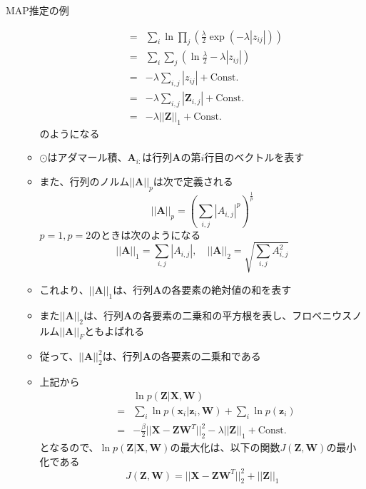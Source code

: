 \documentclass[dvipdfmx,notheorems,t]{beamer}
\begin{document}
\begin{frame}{MAP推定の例}
\begin{itemize}
\begin{itemize}
\begin{eqnarray}
			&=& \sum_i \ln \prod_j \left( \frac{\lambda}{2} \exp \left( -\lambda |z_{ij}| \right) \right) \nonumber \\
			&=& \sum_i \sum_j \left( \ln \frac{\lambda}{2} - \lambda |z_{ij}| \right) \nonumber \\
			&=& -\lambda \sum_{i, j} |z_{ij}| + \mathrm{Const.} \\
			&=& -\lambda \sum_{i, j} |\bm{Z}_{i, j}| + \mathrm{Const.} \\
			&=& -\lambda || \bm{Z} ||_1 + \mathrm{Const.}
		\end{eqnarray}
		のようになる
		\newline
		
		\item $\odot$はアダマール積、$\bm{A}_{i:}$は行列$\bm{A}$の第$i$行目のベクトルを表す
		
		\item また、行列のノルム$|| \bm{A} ||_p$は次で定義される
		\begin{equation}
			|| \bm{A} ||_p = \left( \sum_{i, j} |A_{i, j}|^p \right)^\frac{1}{p}
		\end{equation}
		$p = 1, p = 2$のときは次のようになる
		\begin{equation}
			|| \bm{A} ||_1 = \sum_{i, j} |A_{i, j}|, \quad || \bm{A} ||_2 = \sqrt{\sum_{i, j} A_{i, j}^2}
		\end{equation}
		
		\item これより、$|| \bm{A} ||_1$は、\color{red}行列$\bm{A}$の各要素の絶対値の和\normalcolor を表す
		\item また$|| \bm{A} ||_2$は、行列$\bm{A}$の各要素の二乗和の平方根を表し、\alert{フロベニウスノルム}$|| \bm{A} ||_F$ともよばれる
		\item 従って、$|| \bm{A} ||_2^2$は、\color{red}行列$\bm{A}$の各要素の二乗和\normalcolor である
		\newline
		\item 上記から
		\begin{eqnarray}
			&& \ln p(\bm{Z} | \bm{X}, \bm{W}) \nonumber \\
			&=& \sum_i \ln p(\bm{x}_i | \bm{z}_i, \bm{W}) + \sum_i \ln p(\bm{z}_i) \nonumber \\
			&=& -\frac{\beta}{2} || \bm{X} - \bm{Z} \bm{W}^T ||_2^2 - \lambda || \bm{Z} ||_1 + \mathrm{Const.}
		\end{eqnarray}
		となるので、$\ln p(\bm{Z} | \bm{X}, \bm{W})$の最大化は、以下の\color{red}関数$J(\bm{Z}, \bm{W})$の最小化\normalcolor である
		\begin{equation}
			J(\bm{Z}, \bm{W}) = || \bm{X} - \bm{Z} \bm{W}^T ||_2^2 + || \bm{Z} ||_1
		\end{equation}
	\end{itemize} \
		

\end{itemize}
\end{frame}
\end{document}

